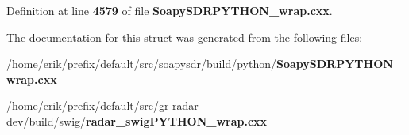 Definition at line {\bf 4579} of file {\bf Soapy\+S\+D\+R\+P\+Y\+T\+H\+O\+N\+\_\+wrap.\+cxx}.



The documentation for this struct was generated from the following files\+:\begin{DoxyCompactItemize}
\item 
/home/erik/prefix/default/src/soapysdr/build/python/{\bf Soapy\+S\+D\+R\+P\+Y\+T\+H\+O\+N\+\_\+wrap.\+cxx}\item 
/home/erik/prefix/default/src/gr-\/radar-\/dev/build/swig/{\bf radar\+\_\+swig\+P\+Y\+T\+H\+O\+N\+\_\+wrap.\+cxx}\end{DoxyCompactItemize}
